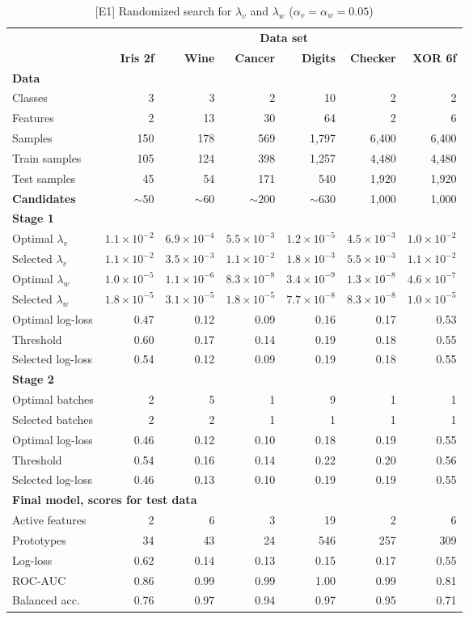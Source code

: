 %
\begin{table}
\caption{[E1] Randomized search for $\lambda_v$ and $\lambda_w$ ($\alpha_v=\alpha_w=0.05$)}
\label{tab_e1}
%
\begin{center}
\small
\begin{tabular}{|lrrrrrr|}
\hline
&\multicolumn{6}{c|}{\textbf{\hrulefill\ Data set \hrulefill}}\\
&\textbf{Iris 2f}&\textbf{Wine}&\textbf{Cancer}&\textbf{Digits}&\textbf{Checker}&\textbf{XOR 6f}\\
\multicolumn{7}{|l|}{\textbf{Data}}\\
Classes&3&3&2&10&2&2\\
Features&2&13&30&64&2&6\\
Samples&150&178&569&1,797&6,400&6,400\\
Train samples&105&124&398&1,257&4,480&4,480\\
Test samples&45&54&171&540&1,920&1,920\\
\textbf{Candidates}&$\sim50$&$\sim60$&$\sim200$&$\sim630$&1,000&1,000\\
\multicolumn{7}{|l|}{\textbf{Stage 1}}\\
Optimal $\lambda_v$&$1.1\times10^{-2}$&$6.9\times10^{-4}$&$5.5\times10^{-3}$&$1.2\times10^{-5}$&$4.5\times10^{-3}$&$1.0\times10^{-2}$\\
Selected $\lambda_v$&$1.1\times10^{-2}$&$3.5\times10^{-3}$&$1.1\times10^{-2}$&$1.8\times10^{-3}$&$5.5\times10^{-3}$&$1.1\times10^{-2}$\\
Optimal $\lambda_w$&$1.0\times10^{-5}$&$1.1\times10^{-6}$&$8.3\times10^{-8}$&$3.4\times10^{-9}$&$1.3\times10^{-8}$&$4.6\times10^{-7}$\\
Selected $\lambda_w$&$1.8\times10^{-5}$&$3.1\times10^{-5}$&$1.8\times10^{-5}$&$7.7\times10^{-8}$&$8.3\times10^{-8}$&$1.0\times10^{-5}$\\
Optimal log-loss&0.47&0.12&0.09&0.16&0.17&0.53\\
Threshold&0.60&0.17&0.14&0.19&0.18&0.55\\
Selected log-loss&0.54&0.12&0.09&0.19&0.18&0.55\\
\multicolumn{7}{|l|}{\textbf{Stage 2}}\\
Optimal batches&2&5&1&9&1&1\\
Selected batches&2&2&1&1&1&1\\
Optimal log-loss&0.46&0.12&0.10&0.18&0.19&0.55\\
Threshold&0.54&0.16&0.14&0.22&0.20&0.56\\
Selected log-loss&0.46&0.13&0.10&0.19&0.19&0.55\\
\multicolumn{7}{|l|}{\textbf{Final model, scores for test data}}\\
Active features&2&6&3&19&2&6\\
Prototypes&34&43&24&546&257&309\\
Log-loss&0.62&0.14&0.13&0.15&0.17&0.55\\
ROC-AUC&0.86&0.99&0.99&1.00&0.99&0.81\\
Balanced acc.&0.76&0.97&0.94&0.97&0.95&0.71\\
\hline
\end{tabular}
\end{center}
\end{table}
